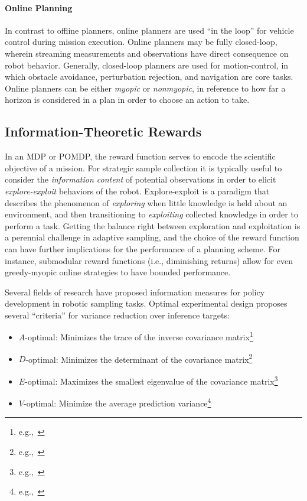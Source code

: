 \paragraph{Online Planning}
In contrast to offline planners, online planners are used ``in the loop'' for vehicle control during mission execution.
Online planners may be fully closed-loop, wherein streaming measurements and observations have direct consequence on robot behavior.
Generally, closed-loop planners are used for motion-control, in which obstacle avoidance, perturbation rejection, and navigation are core tasks\autocite{majumdar2013robust,esposito2002method}.
Online planners can be either \emph{myopic}\autocite{vergassola2007infotaxis,edwards2005moth} or \emph{nonmyopic}\autocite{Arora2017,singh2009nonmyopic,Lim2016,meliou2007nonmyopic,kurniawati2008sarsop,somani2013despot,sunberg2018online,browne2012survey}, in reference to how far a horizon is considered in a plan in order to choose an action to take.

\subsection{Information-Theoretic Rewards}
In an MDP or POMDP, the reward function serves to encode the scientific objective of a mission. For strategic sample collection it is typically useful to consider the \emph{information content} of potential observations in order to elicit \emph{explore-exploit} behaviors of the robot. Explore-exploit is a paradigm that describes the phenomenon of \emph{exploring} when little knowledge is held about an environment, and then transitioning to \emph{exploiting} collected knowledge in order to perform a task. Getting the balance right between exploration and exploitation is a perennial challenge in adaptive sampling, and the choice of the reward function can have further implications for the performance of a planning scheme. For instance, submodular reward functions (i.e., diminishing returns) allow for even greedy-myopic online strategies to have bounded performance\autocite{horel2016notes}. 

Several fields of research have proposed information measures for policy development in robotic sampling tasks. Optimal experimental design\autocite{fedorov2013theory} proposes several ``criteria'' for variance reduction over inference targets:

\begin{itemize}
	\item $A$-optimal: Minimizes the trace of the inverse covariance matrix\footnote{e.g.,~\cite{sim2005global,kollar2008trajectory,carrillo2015monotonicity}}
	\item $D$-optimal: Minimizes the determinant of the covariance matrix\footnote{e.g.,~\cite{kollar2008trajectory,carrillo2015monotonicity,joshi2008sensor,joshi2008sensor}}
	\item $E$-optimal: Maximizes the smallest eigenvalue of the covariance matrix\footnote{e.g.,~\cite{carrillo2015monotonicity}}
	\item $V$-optimal: Minimize the average prediction variance\footnote{e.g.,~\cite{cohn1994neural}}
\end{itemize}

